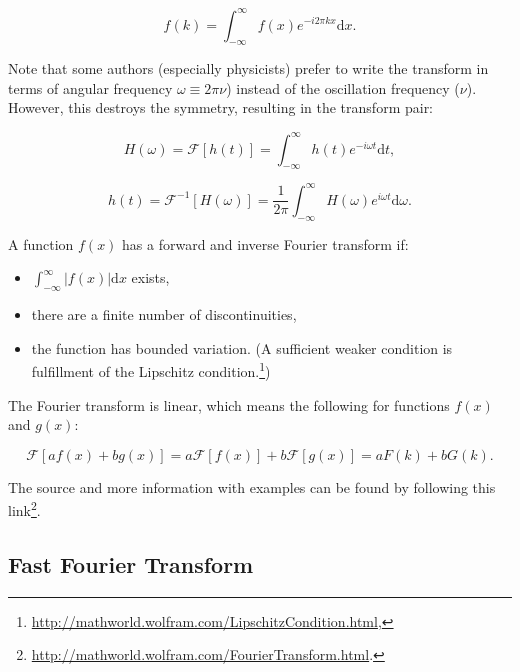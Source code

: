 \documentclass[12pt]{article}
\theoremstyle{plain}
\begin{document}
\begin{equation}
f(k) = \int_{-\infty}^{\infty} f(x) e^{-i 2 \pi k x} \text{d}x.
\end{equation}

Note that some authors (especially physicists) prefer to write the transform in terms of angular frequency $\omega \equiv 2 \pi \nu$) instead of the oscillation frequency ($\nu$). However, this destroys the symmetry, resulting in the transform pair:


\begin{equation}
H(\omega) = \mathcal{F}[h(t)] = \int_{-\infty}^{\infty} h(t) e^{-i \omega t} \text{d}t,
\end{equation}

\begin{equation}
h(t) = \mathcal{F}^{-1}[H(\omega)] = \frac{1}{2 \pi} \int_{-\infty}^{\infty} H(\omega) e^{i \omega t} \text{d}\omega.
\end{equation}

A function $f(x)$ has a forward and inverse Fourier transform if:

\begin{itemize}
	\item $\int_{-\infty}^{\infty} |f(x)| \text{d}x$ exists,
	\item there are a finite number of discontinuities,
	\item the function has bounded variation. (A sufficient weaker condition is fulfillment of the Lipschitz condition.\footnote{\url{http://mathworld.wolfram.com/LipschitzCondition.html},})
\end{itemize}

The Fourier transform is linear, which means the following for functions $f(x)$ and $g(x)$:

\begin{equation}
\mathcal{F}[a f(x) + b g(x)] = a \mathcal{F}[f(x)] + b \mathcal{F}[g(x)] = a F(k) + b G(k).
\end{equation}

The source and more information with examples can be found by following this link\footnote{\url{http://mathworld.wolfram.com/FourierTransform.html}.}. 

\subsection{Fast Fourier Transform}
\end{document}
